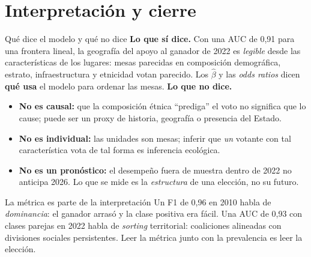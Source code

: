 \documentclass{beamer}
\newcommand{\1}{\mathbb{I}}
\begin{document}
\section{Interpretación y cierre}
\begin{frame}[noframenumbering]
\tableofcontents[currentsection]
\end{frame}

\begin{frame}{Qué dice el modelo y qué no dice}
\small
\textbf{Lo que sí dice.} Con una AUC de 0,91 para una frontera lineal, la geografía del apoyo al ganador de 2022 es \emph{legible} desde las características de los lugares: mesas parecidas en composición demográfica, estrato, infraestructura y etnicidad votan parecido. Los $\hat{\beta}$ y las \emph{odds ratios} dicen \textbf{qué usa} el modelo para ordenar las mesas.
\pause
\vspace{0.1cm}
\textbf{Lo que no dice.}
\begin{itemize}\itemsep3pt
  \item \textbf{No es causal:} que la composición étnica ``prediga'' el voto no significa que lo cause; puede ser un proxy de historia, geografía o presencia del Estado.
  \item \textbf{No es individual:} las unidades son mesas; inferir que \emph{un} votante con tal característica vota de tal forma es inferencia ecológica.
  \item \textbf{No es un pronóstico:} el desempeño fuera de muestra dentro de 2022 no anticipa 2026. Lo que se mide es la \emph{estructura} de una elección, no su futuro.
\end{itemize}
\pause
\vspace{0.1cm}
\begin{block}{La métrica es parte de la interpretación}
Un F1 de 0,96 en 2010 habla de \emph{dominancia}: el ganador arrasó y la clase positiva era fácil. Una AUC de 0,93 con clases parejas en 2022 habla de \emph{sorting} territorial: coaliciones alineadas con divisiones sociales persistentes. Leer la métrica junto con la prevalencia es leer la elección.
\end{block}
\end{frame}
\end{document}
